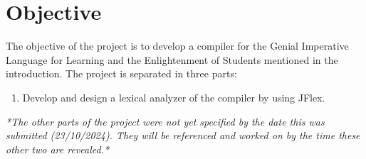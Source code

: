 \setcounter{secnumdepth}{2}

\chapter{Objective}

The objective of the project is to develop a compiler for the Genial Imperative Language for Learning and the Enlightenment of Students mentioned in the introduction.
The project is separated in three parts:

\begin{enumerate}
    \item Develop and design a lexical analyzer of the compiler by using JFlex.
\end{enumerate}

\begin{center}
    \textit{*The other parts of the project were not yet specified by the date this was submitted (23/10/2024). They will be referenced and worked on by the time these other two are revealed.*}
\end{center}
